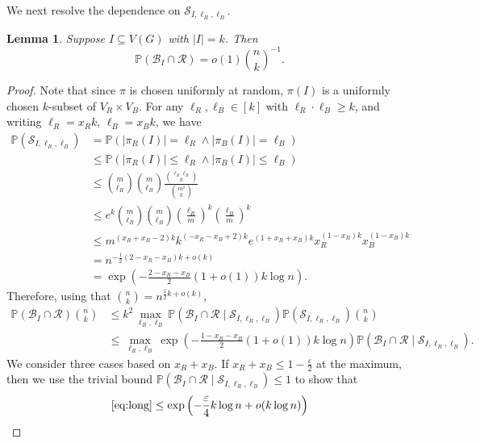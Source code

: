 \documentclass{article}
\newcommand{\p}{\mathbb{P}}
\newtheorem{lemma}[theorem]{Lemma}
\begin{document}
We next resolve the dependence on $\mathcal{S}_{I, \ell_R, \ell_B}$.
\begin{lemma}\label{lem:RI}
    Suppose $I \subseteq V(G)$ 
    with $|I| = k$.  
    Then
\[
\p(\mathcal{B}_I \cap \mathcal R ) =o(1){n\choose k}^{-1}.  
\]
\end{lemma}
\begin{proof}
Note that since $\pi$ is chosen uniformly at random,
$\pi(I)$ is a uniformly chosen $k$-subset of $V_R \times V_B$.  
    For any $\ell_R,\ell_B\in [k]$ with $\ell_R\cdot\ell_B\ge k$, and writing $\ell_R=x_Rk$, $\ell_B=x_Bk$, we have
    \begin{align*}
        \p(\mathcal{S}_{I, \ell_R, \ell_B}) &=\p(|\pi_R(I)|=\ell_R\land |\pi_B(I)|=\ell_B)\\
        &\le \p(|\pi_R(I)|\le \ell_R\land |\pi_B(I)|\le \ell_B)\\
        &\le {{m} \choose \ell_R} {{m} \choose \ell_B} \frac{{\ell_R\ell_B \choose k}}{{{m}^2 \choose k}}\\
        &\le e^{k} {{m} \choose \ell_R} {{m} \choose \ell_B} \left( \frac{\ell_R}{{m}} \right)^{k} \left( \frac{\ell_B}{{m}} \right)^{k}\\
        &\le {m}^{(x_R+x_B-2)k}k^{(-x_R-x_B+2)k}e^{(1+x_R+x_B)k}x_R^{(1-x_R)k}x_B^{(1-x_B)k}\\
        &=n^{-\frac12(2-x_R-x_B)k+o(k)}\\
        &= \exp\left( -\frac{2-x_R-x_B}{2}(1+o(1))k \log {n}\right).
    \end{align*}
    Therefore, using that ${n\choose k}=n^{\frac12 k+o(k)}$,
    \begin{align}
        \p(\mathcal{B}_I \cap \mathcal R) {n\choose k}
        &\le k^2\max_{\ell_R,\ell_B}\p(\mathcal{B}_I \cap \mathcal R\mid  \mathcal{S}_{I, \ell_R, \ell_B}) \p(\mathcal{S}_{I, \ell_R, \ell_B}) {n\choose k} \nonumber\\
        &\le \max_{\ell_R,\ell_B}\exp\left(-\frac{1-x_R-x_B}{2}(1+o(1))k \log {n}\right)\p(\mathcal{B}_I \cap \mathcal R\mid \mathcal{S}_{I, \ell_R, \ell_B}).\label{eq:long}
    \end{align}
    We consider three cases based on $x_R+x_B$. 
    If $x_R+x_B\le 1-\frac{\varepsilon}{2}$ at the maximum, then we use the trivial bound $\p(\mathcal{B}_I \cap \mathcal R\mid  \mathcal{S}_{I, \ell_R, \ell_B})\le 1$ to show that
\begin{align*}
    \eqref{eq:long}&\le  \exp \left(-\frac{\varepsilon}{4}k\log n + o(k\log n)\right)\\

\end{align*}
\end{proof}
\end{document}
